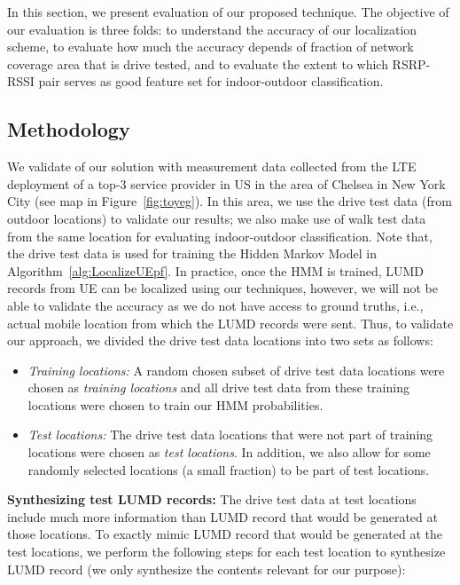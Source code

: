 \documentclass[conference, 10pt]{IEEEtran}
\begin{document}
In this section, we present evaluation of our proposed technique. The objective of
our evaluation is three folds: to understand the accuracy of our localization scheme, to evaluate
how much the accuracy depends of fraction of network coverage area that is drive
tested, and to evaluate the extent to which RSRP-RSSI pair serves as good feature set
for indoor-outdoor classification.

\subsection{Methodology}
We validate of our solution with measurement data collected from the LTE deployment of a top-3 service
provider in US in the area of Chelsea in New York City (see map in
Figure~\ref{fig:toyeg}). In this area, we use the
drive test data (from outdoor locations) to validate our results; we also make use of
walk test data from the same location for evaluating indoor-outdoor classification. Note that, the
drive test data is used for training the Hidden Markov Model in
Algorithm~\ref{alg:LocalizeUEpf}. In practice, once the HMM is trained, LUMD records
from UE can be localized using our techniques, however, we will not be able to
validate the accuracy as we do not have access to ground truths, i.e., actual mobile
location from which the LUMD records were sent. Thus, to validate our approach, we divided the
drive test data locations into two sets as follows:

\begin{itemize}

	\item {\em Training locations:} A random chosen subset of drive test data
		locations were chosen as {\em training locations} and all drive test data
		from these training locations were chosen to train our HMM
		probabilities. 

	\item {\em Test locations:} The drive test data locations that were not part
		of training locations were chosen as {\em test locations}. In addition, we
		also allow for some randomly selected locations (a small fraction) to be part of test
		locations. 
\end{itemize}
		
		
{\bf Synthesizing test LUMD records:} The drive test data at test locations
include much more information than LUMD record that would be generated at those
locations. To exactly mimic LUMD record that would be generated at the test
locations, we perform the following steps for each test location to synthesize LUMD
record (we only synthesize the contents relevant for our purpose): 
\end{document}
